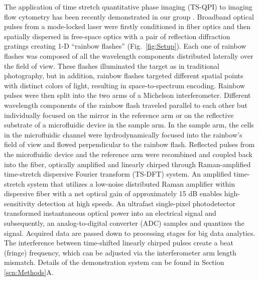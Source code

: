 \documentclass[aps,pra,reprint,longbibliography,superscriptaddress]{revtex4-1}
\begin{document}
The application of time stretch quantitative phase imaging (TS-QPI) to imaging flow cytometry has been recently demonstrated in our group \cite{mahjoubfar2013label}. Broadband optical pulses from a mode-locked laser were firstly conditioned in fiber optics and then spatially dispersed in free-space optics with a pair of reflection diffraction gratings creating 1-D ``rainbow flashes'' (Fig.~\ref{fig:Setup}). Each one of rainbow flashes was composed of all the wavelength components distributed laterally over the field of view. These flashes illuminated the target as in traditional photography, but in addition, rainbow flashes targeted different spatial points with distinct colors of light, resulting in space-to-spectrum encoding. Rainbow pulses were then split into the two arms of a Michelson interferometer. Different wavelength components of the rainbow flash traveled parallel to each other but individually focused on the mirror in the reference arm or on the reflective substrate of a microfluidic device in the sample arm. In the sample arm, the cells in the microfluidic channel were hydrodynamically focused \cite{knight1998hydrodynamic,lee2006hydrodynamic} into the rainbow's field of view and flowed perpendicular to the rainbow flash. Reflected pulses from the microfluidic device and the reference arm were recombined and coupled back into the fiber, optically amplified and linearly chirped through Raman-amplified time-stretch dispersive Fourier transform (TS-DFT) system. An amplified time-stretch system that utilizes a low-noise distributed Raman amplifier within dispersive fiber with a net optical gain of approximately 15 dB enables high-sensitivity detection at high speeds. An ultrafast single-pixel photodetector transformed instantaneous optical power into an electrical signal and subsequently, an analog-to-digital converter (ADC) samples and quantizes the signal. Acquired data are passed down to processing stages for big data analytics. The interference between time-shifted linearly chirped pulses create a beat (fringe) frequency, which can be adjusted via the interferometer arm length mismatch. Details of the demonstration system can be found in Section \ref{scn:Methods}A.
\end{document}
